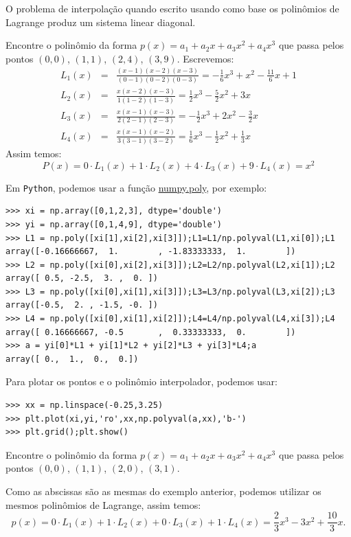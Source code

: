 \begin{obs} O problema de interpolação quando escrito usando como base os polinômios de Lagrange produz um sistema linear diagonal.
\end{obs}

\begin{ex}Encontre o polinômio da forma $p(x)=a_1+a_2x+a_3x^2+a_4x^3$ que passa pelos pontos $(0, 0)$, $(1, 1)$, $(2, 4)$, $(3, 9)$.
Escrevemos:
\begin{eqnarray*}
L_1(x)&=& \frac{(x-1)(x-2)(x-3)}{(0-1)(0-2)(0-3)}=-\frac{1}{6}x^3+x^2-\frac{11}{6}x+1\\
L_2(x)&=& \frac{x(x-2)(x-3)}{1(1-2)(1-3)}=\frac{1}{2}x^3-\frac{5}{2}x^2+3x\\
L_3(x)&=& \frac{x(x-1)(x-3)}{2(2-1)(2-3)}=-\frac{1}{2}x^3+2x^2-\frac{3}{2}x\\
L_4(x)&=& \frac{x(x-1)(x-2)}{3(3-1)(3-2)}=\frac{1}{6}x^3-\frac{1}{2}x^2+\frac{1}{3}x
\end{eqnarray*}
Assim temos:
\begin{equation*}
  P(x)=0\cdot L_1(x)+1\cdot L_2(x)+4\cdot L_3(x)+9\cdot L_4(x)=x^2
\end{equation*}

\ifispython
Em \verb+Python+, podemos usar a função \href{https://docs.scipy.org/doc/numpy/reference/generated/numpy.poly.html}{numpy.poly}, por exemplo:
\begin{verbatim}
>>> xi = np.array([0,1,2,3], dtype='double')
>>> yi = np.array([0,1,4,9], dtype='double')
>>> L1 = np.poly([xi[1],xi[2],xi[3]]);L1=L1/np.polyval(L1,xi[0]);L1
array([-0.16666667,  1.        , -1.83333333,  1.        ])
>>> L2 = np.poly([xi[0],xi[2],xi[3]]);L2=L2/np.polyval(L2,xi[1]);L2
array([ 0.5, -2.5,  3. ,  0. ])
>>> L3 = np.poly([xi[0],xi[1],xi[3]]);L3=L3/np.polyval(L3,xi[2]);L3
array([-0.5,  2. , -1.5, -0. ])
>>> L4 = np.poly([xi[0],xi[1],xi[2]]);L4=L4/np.polyval(L4,xi[3]);L4
array([ 0.16666667, -0.5       ,  0.33333333,  0.        ])
>>> a = yi[0]*L1 + yi[1]*L2 + yi[2]*L3 + yi[3]*L4;a
array([ 0.,  1.,  0.,  0.])
\end{verbatim}
Para plotar os pontos e o polinômio interpolador, podemos usar:
\begin{verbatim}
>>> xx = np.linspace(-0.25,3.25)
>>> plt.plot(xi,yi,'ro',xx,np.polyval(a,xx),'b-')
>>> plt.grid();plt.show()
\end{verbatim}
\fi
\end{ex}

\begin{ex}Encontre o polinômio da forma $p(x)=a_1+a_2x+a_3x^2+a_4x^3$ que passa pelos pontos $(0, 0)$, $(1, 1)$, $(2, 0)$, $(3, 1)$.
\end{ex}
\begin{sol}
Como as abscissas são as mesmas do exemplo anterior, podemos utilizar os mesmos polinômios de Lagrange, assim temos:
\begin{equation*}
  p(x)=0\cdot L_1(x)+1\cdot L_2(x)+0\cdot L_3(x)+1\cdot L_4(x)=\frac{2}{3}x^3-3x^2+\frac{10}{3}x.
\end{equation*}
\end{sol}

